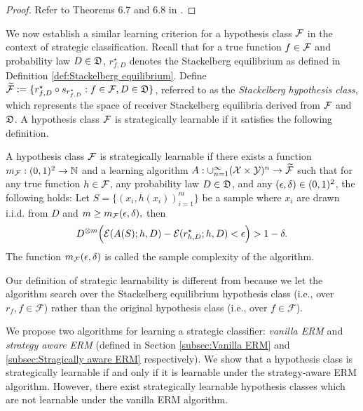 \begin{proof}
Refer to Theorems 6.7 and 6.8 in \cite{shalev-shwartz_ben-david_2014}.
\end{proof}

We now establish a similar learning criterion for a hypothesis class $\mathcal{F}$ in the context of strategic classification. Recall that for a true function $f \in \mathcal{F}$ and probability law $D \in \mathfrak{D}$, $r^\star_{f,D}$ denotes the Stackelberg equilibrium as defined in Definition \ref{def:Stackelberg equilibrium}. Define $\widetilde{\mathcal{F}} := \{r^\star_{f,D} \circ s_{r^\star_{f,D}} : f \in \mathcal{F}, D \in \mathfrak{D}\}$, referred to as the \emph{Stackelberg hypothesis class}, which represents the space of receiver Stackelberg equilibria derived from $\mathcal{F}$ and $\mathfrak{D}$. A hypothesis class $\mathcal{F}$ is strategically learnable if it satisfies the following definition.

\begin{defn}\label{def:Strategically learnable class}
A hypothesis class $\mathcal{F}$ is strategically learnable if there exists a function $m_{\mathcal{F}}: (0,1)^2 \to \mathbb{N}$ and a learning algorithm $A: \cup_{n=1}^\infty (\mathcal{X} \times \mathcal{Y})^n \to \widetilde{\mathcal{F}}$ such that for any true function $h \in \mathcal{F}$, any probability law $D \in \mathfrak{D}$, and any $(\epsilon, \delta) \in (0,1)^2$, the following holds: Let $S = \{(x_i, h(x_i))_{i=1}^m\}$ be a sample where $x_i$ are drawn i.i.d. from $D$ and $m \geq m_{\mathcal{F}}(\epsilon, \delta),$
then
\begin{equation}\label{def: strategically learnable}
D^{\otimes m}\Big( \mathcal{E}(A(S); h, D) - \mathcal{E}(r^\star_{h, D}; h, D) < \epsilon \Big) > 1 - \delta.
\end{equation}
The function $m_{\mathcal{F}}(\epsilon, \delta)$ is called the sample complexity of the algorithm.
\end{defn}


Our definition of strategic learnability is different from \cite{sundaram2021pac} because we let the algorithm search over the Stackelberg equilibrium hypothesis class (i.e., over $r_f, f \in \mathcal{F}$) rather than the original hypothesis class (i.e., over $f \in \mathcal{F}$). 


We propose two algorithms for learning a strategic classifier: \textit{vanilla ERM} and \textit{strategy aware ERM} (defined in Section \ref{subsec:Vanilla ERM} and \ref{subsec:Stragically aware ERM} respectively). We show that a hypothesis class is strategically learnable if and only if it is learnable under the strategy-aware ERM algorithm. 
However, there exist strategically learnable hypothesis classes which are not
learnable under the vanilla ERM algorithm.

